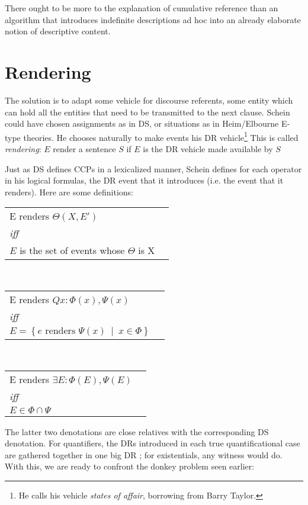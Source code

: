 \documentclass[english]{article}
\begin{document}
\begin{squ}
There ought to be more to the explanation of cumulative reference than an algorithm that introduces indefinite descriptions ad hoc into an already elaborate notion of descriptive content.
\end{squ}

\section{Rendering}

The solution is to adapt some vehicle for discourse referents, some entity which can hold all the entities that need to be transmitted to the next clause. Schein could have chosen assignments as in DS, or situations as in Heim/Elbourne E-type  theories. He chooses naturally to make events his DR vehicle\footnote{He calls his vehicle \emph{states of affair}, borrowing from Barry Taylor.} This is called \emph{rendering}: $E$ render a sentence $S$ if $E$ is the DR vehicle made available by $S$

Just as DS defines CCPs in a lexicalized manner, Schein defines for each operator in his logical formulas, the DR event that it introduces (i.e. the event that it renders). Here are some definitions:

\ex
\begin{tabular}[t]{ll}
  E renders $\Theta (X, E')$
  \\
  \emph{iff}
  \\
  $E$ is the set of events whose $\Theta$ is X\footnotemark
\end{tabular} 
\xe
%
\ex~
\begin{tabular}[t]{ll}
E renders $Q x: \Phi(x), \Psi(x)$
\\
\emph{iff}
\\
$E= \left\lbrace e\text{ renders }\Psi(x)\ \middle|\ x\in\Phi\right\rbrace$
\end{tabular} 
\xe
%
\ex~ \label{exist}
\begin{tabular}[t]{ll}
E renders $\exists E: \Phi(E), \Psi(E)$
\\
\emph{iff}
\\
$E\in \Phi\cap\Psi$
\end{tabular} 
\xe
%
The latter two denotations are close relatives with the corresponding DS denotation. For quantifiers, the DRs introduced in each true quantificational case are gathered together in one big DR ; for existentials, any witness would do. With this, we are ready to confront the donkey problem seen earlier:
\end{document}
